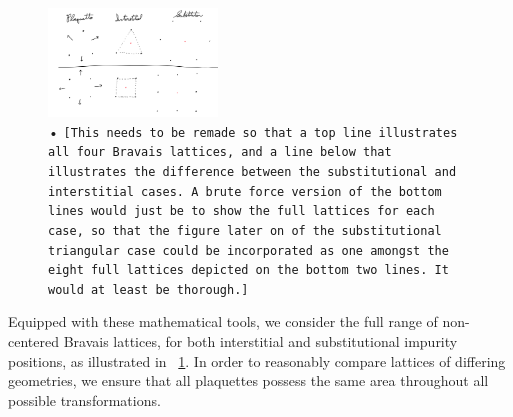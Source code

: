 \documentclass[aps,pra,superscriptaddress,twocolumn]{revtex4-1}
\newcommand{\fref}[1]{\text{Fig.}~\ref{#1}}
\newcommand{\commentSB}[1]{\texttt{\color{blue}[#1]}}
\begin{document}
\begin{figure}
    \centering
    \includegraphics[width=0.4\textwidth]{figures/triangle_and_square.png} 
    \caption{• \commentSB{This needs to be remade so that a top line illustrates all four Bravais lattices, and a line below that illustrates the difference between the substitutional and interstitial cases. A brute force version of the bottom lines would just be to show the full lattices for each case, so that the figure later on of the substitutional triangular case could be incorporated as one amongst the eight full lattices depicted on the bottom two lines. It would at least be thorough.}}
    \label{fig:Bravais}
\end{figure}

Equipped with these mathematical tools, we consider the full range of non-centered Bravais lattices, for both interstitial and substitutional impurity positions, as illustrated in \fref{fig:Bravais}. In order to reasonably compare lattices of differing geometries, we ensure that all plaquettes possess the same area throughout all possible transformations. 




\end{document}
